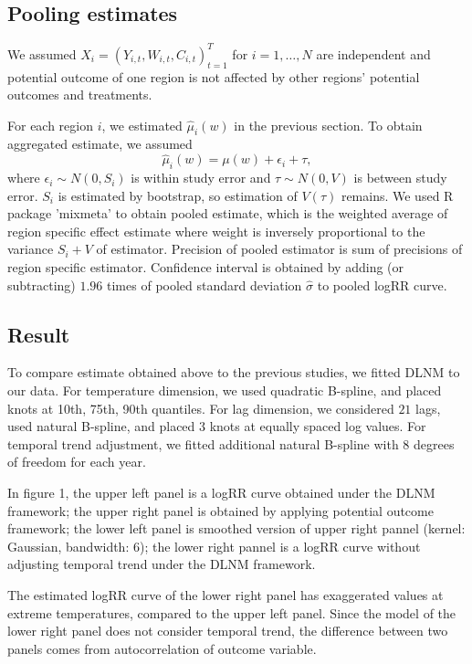 \documentclass[12pt]{article}
\begin{document}
\subsection{Pooling estimates}

We assumed $X_i = (Y_{i,t}, W_{i,t}, C_{i,t})_{t = 1}^T$ for $i = 1, \dots, N$ are independent
and potential outcome of one region is not affected by other regions' potential outcomes and treatments.

For each region $i$, we estimated $\hat{\mu}_i(w)$ in the previous section.
To obtain aggregated estimate, we assumed
\[
	\hat{\mu}_i(w) = \mu(w) + \epsilon_i + \tau,
\]
where $\epsilon_i \sim N(0, S_i)$ is within study error and $\tau \sim N(0, V)$ is between study error.
$S_i$ is estimated by bootstrap,
so estimation of $V(\tau)$ remains.
We used R package 'mixmeta' to obtain pooled estimate,
which is the weighted average of region specific effect estimate
where weight is inversely proportional to the variance $S_i + V$ of estimator.
Precision of pooled estimator is sum of precisions of region specific estimator.
Confidence interval is obtained by adding (or subtracting) 
$1.96$ times of pooled standard deviation $\hat{\sigma}$ to pooled logRR curve.

\subsection{Result}

To compare estimate obtained above to the previous studies, we fitted DLNM to our data.
For temperature dimension, 
we used quadratic B-spline, and placed knots at 10th, 75th, 90th quantiles.
For lag dimension,
we considered $21$ lags, used natural B-spline, and placed $3$ knots at equally spaced log values.
For temporal trend adjustment,
we fitted additional natural B-spline with $8$ degrees of freedom for each year.

In figure 1,
the upper left panel is a logRR curve obtained under the DLNM framework;
the upper right panel is obtained by applying potential outcome framework;
the lower left panel is smoothed version of upper right pannel (kernel: Gaussian, bandwidth: $6$);
the lower right pannel is a logRR curve without adjusting temporal trend under the DLNM framework.

The estimated logRR curve of the lower right panel has exaggerated values at extreme temperatures,
compared to the upper left panel.
Since the model of the lower right panel does not consider temporal trend,
the difference between two panels comes from autocorrelation of outcome variable.
\end{document}
